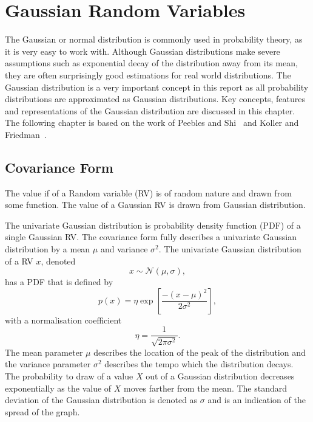 \documentclass[12pt,oneside,openany,a4paper, %
afrikaans,english,
]{memoir}
\numberwithin{equation}{chapter}
\begin{document}
\chapter{Gaussian Random Variables}
The Gaussian or normal distribution is commonly used in probability theory, as it is very easy to work with. Although Gaussian distributions make severe assumptions such as exponential decay of the distribution away from its mean, they are often surprisingly good estimations for real world distributions. The Gaussian distribution is a very important concept in this report as all probability distributions are approximated as Gaussian distributions. Key concepts, features and representations of the Gaussian distribution are discussed in this chapter. The following chapter is based on the work of Peebles and Shi~\cite{peebles} and Koller and Friedman~\cite{koller}.

\section{Covariance Form}
The value if of a Random variable (RV) is of random nature and drawn from some function. The value of a Gaussian RV is drawn from Gaussian distribution.

The univariate Gaussian distribution is probability density function (PDF) of a single Gaussian RV. The covariance form fully describes a univariate Gaussian distribution by a mean $\mu$ and variance $\sigma^2$.
The univariate Gaussian distribution of a RV $x$, denoted
\begin{equation}
x\sim\mathcal{N}(\mu,\sigma),
\end{equation}
has a PDF that is defined by
\begin{equation}\label{eq:1}
p(x) = \eta\exp\left[\frac{-(x-\mu)^2}{2\sigma^2}\right],
\end{equation}
with a normalisation coefficient 
\begin{equation}\label{eq:2}
\eta = \frac{1}{\sqrt{2\pi\sigma^2}}.
\end{equation}
The mean parameter $\mu$ describes the location of the peak of the distribution and the variance parameter $\sigma^2$ describes the tempo which the distribution decays. The probability to draw of a value $X$ out of a Gaussian distribution decreases exponentially as the value of $X$ moves farther from the mean. The standard deviation of the Gaussian distribution is denoted as $\sigma$ and is an indication of the spread of the graph.
\end{document}
